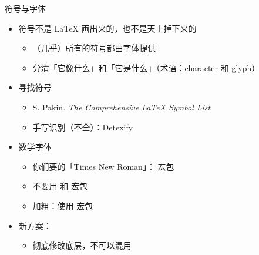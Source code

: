 \begin{frame}{符号与字体}
\begin{itemize}
  \item 符号不是 \LaTeX{} 画出来的，也不是天上掉下来的
    \begin{itemize}
      \item （几乎）所有的符号都由字体提供
      \item 分清「它像什么」和「它是什么」（术语：character 和 glyph）
    \end{itemize}
  \item 寻找符号
    \begin{itemize}
      \item S. Pakin. \emph{The Comprehensive \LaTeX{} Symbol List}
      \item 手写识别（不全）：Detexify 
    \end{itemize}
  \item 数学字体
    \begin{itemize}
      \item 你们要的「Times New Roman」： 宏包
      \item \alert{不要用  和  宏包}
      \item 加粗：使用  宏包
    \end{itemize}
  \item 新方案：
    \begin{itemize}
      \item 彻底修改底层，不可以混用
    \end{itemize}
\end{itemize}
\end{frame}


